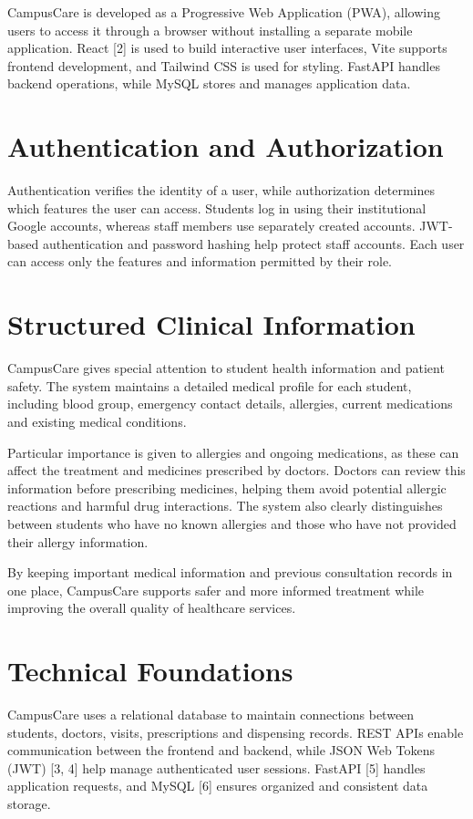 \documentclass[a4paper,oneside,openany]{tietreport}
\begin{document}
CampusCare is developed as a Progressive Web Application
(PWA), allowing users to access it through a browser
without installing a separate mobile application.
React [2] is used to build interactive user interfaces,
Vite supports frontend development, and Tailwind CSS
is used for styling. FastAPI handles backend operations,
while MySQL stores and manages application data.

\section{Authentication and Authorization}

Authentication verifies the identity of a user, while
authorization determines which features the user can access.
Students log in using their institutional Google accounts,
whereas staff members use separately created accounts.
JWT-based authentication and password hashing help protect
staff accounts. Each user can access only the features
and information permitted by their role.

\section{Structured Clinical Information}

CampusCare gives special attention to student health information and patient safety. The system maintains a detailed medical profile for each student, including blood group, emergency contact details, allergies, current medications and existing medical conditions.

Particular importance is given to allergies and ongoing medications, as these can affect the treatment and medicines prescribed by doctors. Doctors can review this information before prescribing medicines, helping them avoid potential allergic reactions and harmful drug interactions. The system also clearly distinguishes between students who have no known allergies and those who have not provided their allergy information.

By keeping important medical information and previous consultation records in one place, CampusCare supports safer and more informed treatment while improving the overall quality of healthcare services.

\section{Technical Foundations}

CampusCare uses a relational database to maintain connections
between students, doctors, visits, prescriptions and
dispensing records. REST APIs enable communication between
the frontend and backend, while JSON Web Tokens (JWT) [3, 4]
help manage authenticated user sessions. FastAPI [5] handles
application requests, and MySQL [6] ensures organized and
consistent data storage.
\end{document}
